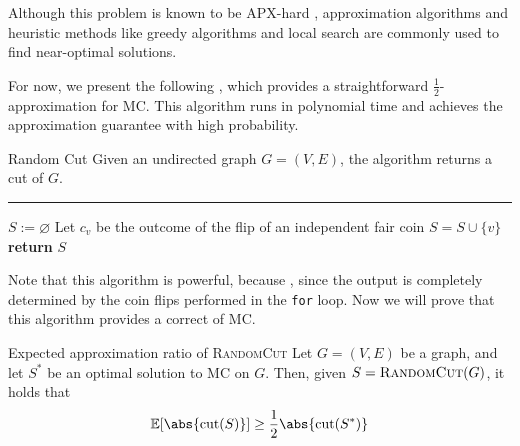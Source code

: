 \documentclass[a4paper, 12pt]{report}
\begin{document}
    Although this problem is known to be \textsf{APX-hard} \cite{maxcut}, approximation algorithms and heuristic methods like greedy algorithms and local search are commonly used to find near-optimal solutions.

    For now, we present the following , which provides a straightforward $\frac{1}{2}$-approximation for MC. This algorithm runs in polynomial time and achieves the approximation guarantee with high probability.

    \begin{framedalgo}[label={max cut alg}]{Random Cut}
        Given an undirected graph $G = (V, E)$, the algorithm returns a cut of $G$. \\
        \hrule

        \quad
        \begin{algorithmic}[1]
                \State $S := \varnothing$
                    \State Let $c_v$ be the outcome of the flip of an independent fair coin
                        \State $S = S \cup \{v\}$
                    \EndIf
                \EndFor
                \State \textbf{return} $S$
            \EndFunction
        \end{algorithmic}
    \end{framedalgo}

    Note that this algorithm is powerful, because , since the output is completely determined by the coin flips performed in the \texttt{for} loop. Now we will prove that this algorithm provides a correct  of MC.
    
    \begin{framedthm}[label={expected random cut}]{Expected approximation ratio of \textsc{RandomCut}}
        Let $G= (V, E)$ be a graph, and let $S^*$ be an optimal solution to MC on $G$. Then, given $S = \textsc{RandomCut}(G)$, it holds that $$\mathbb E [\abs{\mathrm{cut}(S)}] \ge \dfrac{1}{2} \abs{\mathrm{cut}(S^*)}$$
    \end{framedthm}
\end{document}
